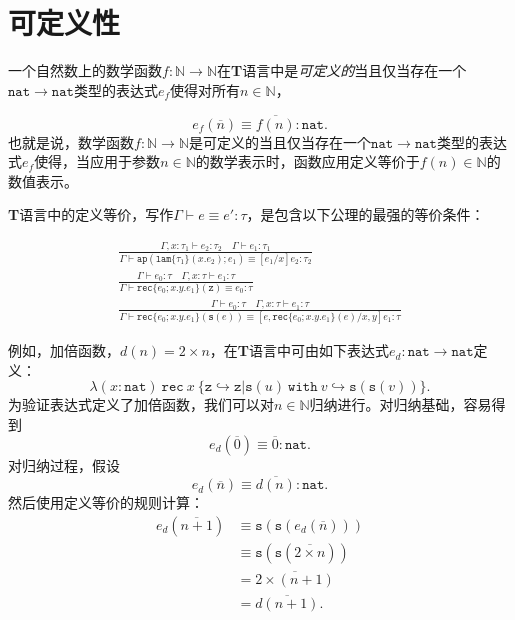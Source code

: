\section{可定义性}

一个自然数上的数学函数$f:\mathbb{N}\to\mathbb{N}$在\textbf{T}语言中是\textit{可定义的}当且仅当存在一个$\mathtt{nat}\to\mathtt{nat}$类型的表达式$e_f$使得对所有$n\in\mathbb{N}$，

\begin{equation}
e_f(\overline{n})\equiv\overline{f(n)}:\mathtt{nat}.
\end{equation}
也就是说，数学函数$f:\mathbb{N}\to\mathbb{N}$是可定义的当且仅当存在一个$\mathtt{nat}\to\mathtt{nat}$类型的表达式$e_f$使得，当应用于参数$n\in\mathbb{N}$的数学表示时，函数应用定义等价于$f(n)\in\mathbb{N}$的数值表示。

\textbf{T}语言中的定义等价，写作$\Gamma\vdash e\equiv e':\tau$，是包含以下公理的最强的等价条件：

\begin{subequations}
\begin{gather}
\frac{\Gamma,x:\tau_1\vdash e_2:\tau_2\quad\Gamma\vdash e_1:\tau_1}{\Gamma\vdash\mathtt{ap}(\mathtt{lam}\{\tau_1\}(x.e_2);e_1)\equiv[e_1/x]e_2:\tau_2}\\
\frac{\Gamma\vdash e_0:\tau\quad\Gamma,x:\tau\vdash e_1:\tau}{\Gamma\vdash\mathtt{rec}\{e_0;x.y.e_1\}(\mathtt{z})\equiv e_0:\tau}\\
\frac{\Gamma\vdash e_0:\tau\quad\Gamma,x:\tau\vdash e_1:\tau}{\Gamma\vdash\mathtt{rec}\{e_0;x.y.e_1\}(\mathtt{s}(e))\equiv[e,\mathtt{rec}\{e_0;x.y.e_1\}(e)/x,y]e_1:\tau}
\end{gather}
\end{subequations}

例如，加倍函数，$d(n)=2\times n$，在\textbf{T}语言中可由如下表达式$e_d:\mathtt{nat}\to\mathtt{nat}$定义：
\begin{equation*}
\lambda(x:\mathtt{nat})\ \mathtt{rec}\ x\ \{\mathtt{z}\hookrightarrow\mathtt{z}|\mathtt{s}(u)\ \mathtt{with}\ v\hookrightarrow\mathtt{s}(\mathtt{s}(v))\}.
\end{equation*}
为验证表达式定义了加倍函数，我们可以对$n\in\mathbb{N}$归纳进行。对归纳基础，容易得到
\begin{equation*}
e_d(\overline{0})\equiv\overline{0}:\mathtt{nat}.
\end{equation*}
对归纳过程，假设
\begin{equation*}
e_d(\overline{n})\equiv\overline{d(n)}:\mathtt{nat}.
\end{equation*}
然后使用定义等价的规则计算：
$$
\begin{array}{ll}
e_d(\overline{n+1})  &\equiv\mathtt{s}(\mathtt{s}(e_d(\overline{n})))\\
                &\equiv\mathtt{s}(\mathtt{s}(\overline{2\times n}))\\
                &=\overline{2\times(n+1)}\\
                &=\overline{d(n+1)}.
\end{array}
$$

